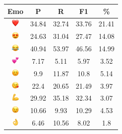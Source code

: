 \documentclass{article}
\begin{document}
\begin{table}
\centering
\begin{tabular}{|c|ccc|c|} \hline
\textbf{Emo} & \textbf{P} & \textbf{R} & \textbf{F1} & \textbf{\%} \\ \hline
\includegraphics[height=0.37cm,width=0.37cm]{img/red_heart.png} & 34.84 & 32.74 & 33.76 & 21.41\\ 
\includegraphics[height=0.37cm,width=0.37cm]{img/smiling_face_with_hearteyes.png} & 24.63 & 31.04 & 27.47 & 14.08\\ 
\includegraphics[height=0.37cm,width=0.37cm]{img/face_with_tears_of_joy.png} & 40.94 & 53.97 & 46.56 & 14.99\\ 
\includegraphics[height=0.37cm,width=0.37cm]{img/two_hearts.png} & 7.17 & 5.11 & 5.97 & 3.52\\ 
\includegraphics[height=0.37cm,width=0.37cm]{img/smiling_face_with_smiling_eyes.png} & 9.9 & 11.87 & 10.8 & 5.14\\ 
\includegraphics[height=0.37cm,width=0.37cm]{img/face_blowing_a_kiss.png} & 22.4 & 20.65 & 21.49 & 3.97\\ 
\includegraphics[height=0.37cm,width=0.37cm]{img/flexed_biceps.png} & 29.92 & 35.18 & 32.34 & 3.07\\ 
\includegraphics[height=0.37cm,width=0.37cm]{img/winking_face.png} & 10.66 & 9.93 & 10.29 & 4.53\\ 
\includegraphics[height=0.37cm,width=0.37cm]{img/OK_hand.png} & 6.46 & 10.56 & 8.02 & 1.8\\ 

\end{tabular}
\end{table}
\end{document}
